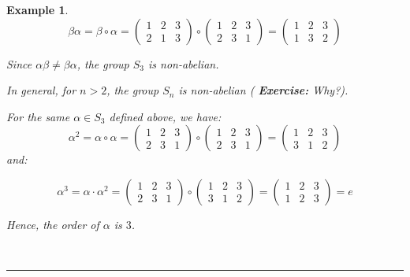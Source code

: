 \documentclass[a4paper,12pt]{report}
\newcounter{statement}
\numberwithin{statement}{chapter}
\newtheorem{eg}[statement]{\bf Example}
\numberwithin{equation}{chapter}
\numberwithin{section}{chapter}
\numberwithin{subsection}{section}
\begin{document}
\begin{eg}
\[
\beta\alpha = \beta\circ\alpha
= \left(\begin{matrix}
1 & 2 & 3\\
2 & 1 & 3
\end{matrix}\right) \circ
\left(\begin{matrix}
1 & 2 & 3\\
2 & 3 & 1
\end{matrix}\right)
=
\left(\begin{matrix}
1 & 2 & 3\\
1 & 3 & 2
\end{matrix}\right)
\]

Since $\alpha\beta \neq \beta\alpha$, the group $S_3$ is non-abelian.




In general, for $n > 2$, the group $S_n$ is non-abelian ( {\bf Exercise:}  Why?).




For the same $\alpha \in S_3$ defined above, we have:
\[
\alpha^2 = \alpha\circ\alpha =
\left(\begin{matrix}
1 & 2 & 3\\
2 & 3 & 1
\end{matrix}\right)\circ
\left(\begin{matrix}
1 & 2 & 3\\
2 & 3 & 1
\end{matrix}\right) =
\left(\begin{matrix}
1 & 2 & 3\\
3 & 1 & 2
\end{matrix}\right)
\]
and:




\[
\alpha^3 = \alpha\cdot\alpha^2
= \left(\begin{matrix}
1 & 2 & 3\\
2 & 3 & 1
\end{matrix}\right)
\circ
\left(\begin{matrix}
1 & 2 & 3\\
3 & 1 & 2
\end{matrix}\right)
=
\left(\begin{matrix}
1 & 2 & 3\\
1 & 2 & 3
\end{matrix}\right) = e
\]

Hence, the order of $\alpha$ is $3$.

\end{eg}

\quad\\\hrule
\quad\\
\end{document}
